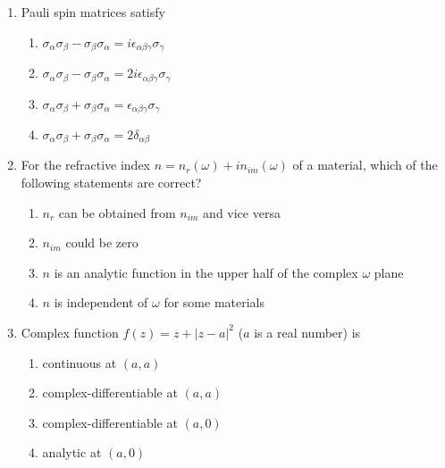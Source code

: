 \documentclass[journal,12pt,onecolumn]{IEEEtran}
\theoremstyle{remark}
\begin{document}
\begin{enumerate}
    \item Pauli spin matrices satisfy
    \begin{enumerate}
        \item $\sigma_{\alpha} \sigma_{\beta} - \sigma_{\beta} \sigma_{\alpha} = i \epsilon_{\alpha \beta \gamma} \sigma_{\gamma}$
        \item $\sigma_{\alpha} \sigma_{\beta} - \sigma_{\beta} \sigma_{\alpha} = 2i \epsilon_{\alpha \beta \gamma} \sigma_{\gamma}$
        \item $\sigma_{\alpha} \sigma_{\beta} + \sigma_{\beta} \sigma_{\alpha} = \epsilon_{\alpha \beta \gamma} \sigma_{\gamma}$
        \item $\sigma_{\alpha} \sigma_{\beta} + \sigma_{\beta} \sigma_{\alpha} = 2\delta_{\alpha \beta}$
    \end{enumerate}
    \item For the refractive index $n = n_r(\omega) + i n_{im}(\omega)$ of a material, which of the following statements are correct?
\begin{enumerate}
    \item $n_r$ can be obtained from $n_{im}$ and vice versa
    \item $n_{im}$ could be zero
    \item $n$ is an analytic function in the upper half of the complex $\omega$ plane
    \item $n$ is independent of $\omega$ for some materials
\end{enumerate}

\item Complex function $f(z) = z + |z - a|^2$ ($a$ is a real number) is
\begin{enumerate}
    \item continuous at $(a, a)$
    \item complex-differentiable at $(a, a)$
    \item complex-differentiable at $(a, 0)$
    \item analytic at $(a, 0)$
\end{enumerate}

\end{enumerate}
\end{document}
